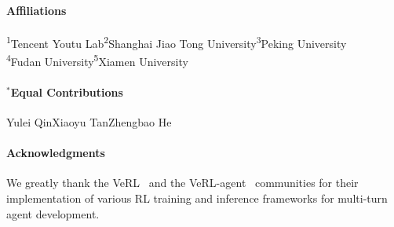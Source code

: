 \documentclass[]{youtu} %
\begin{document}
\paragraph{Affiliations}
\textsuperscript{\rm 1}Tencent Youtu Lab\quad \textsuperscript{\rm 2}Shanghai Jiao Tong University\quad \textsuperscript{\rm 3}Peking University\\\quad\textsuperscript{\rm 4}Fudan University\quad\textsuperscript{\rm 5}Xiamen University

\paragraph{$^*$Equal Contributions}
Yulei Qin\quad Xiaoyu Tan\quad Zhengbao He


\paragraph{Acknowledgments}
We greatly thank the VeRL~\cite{sheng2024hybridflow} and the VeRL-agent~\cite{feng2025group} communities for their implementation of various RL training and inference frameworks for multi-turn agent development.
\end{document}
